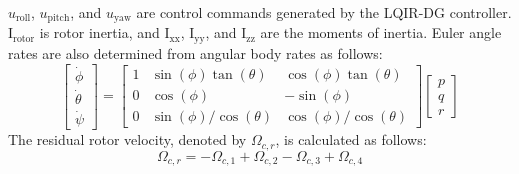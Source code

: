 \documentclass[peerreview]{IEEEtran}
\begin{document}
$u_{\text{roll}}$, $u_{\text{pitch}}$, and $u_{\text{yaw}}$ are control commands generated by the LQIR-DG controller. $\mathrm{I}_{\text{rotor}}$ is rotor inertia, and $\mathrm{I}_{\text{xx}}$, $\mathrm{I}_{\text{yy}}$, and $\mathrm{I}_{\text{zz}}$ are the moments of inertia.
Euler angle rates are also determined from angular body rates as follows:
\begin{equation}
	\begin{bmatrix}
	\dot\phi \\
	\dot\theta \\
	\dot\psi
	\end{bmatrix} = 
	\begin{bmatrix}
	1 & \sin(\phi)\tan(\theta) & \cos(\phi)\tan(\theta) \\
	0 & \cos(\phi) & -\sin(\phi) \\
	0 & \sin(\phi)/\cos(\theta) & \cos(\phi)/\cos(\theta)
	\end{bmatrix}
	\begin{bmatrix}
	p \\
	q \\
	r
	\end{bmatrix}
\end{equation}
The residual rotor velocity, denoted by $\Omega_{c,r}$, is calculated as follows:
\begin{equation}
	\Omega_{c, r} = -\Omega_{c, 1} + \Omega_{c, 2} - \Omega_{c, 3} + \Omega_{c, 4}
\end{equation}
\end{document}
